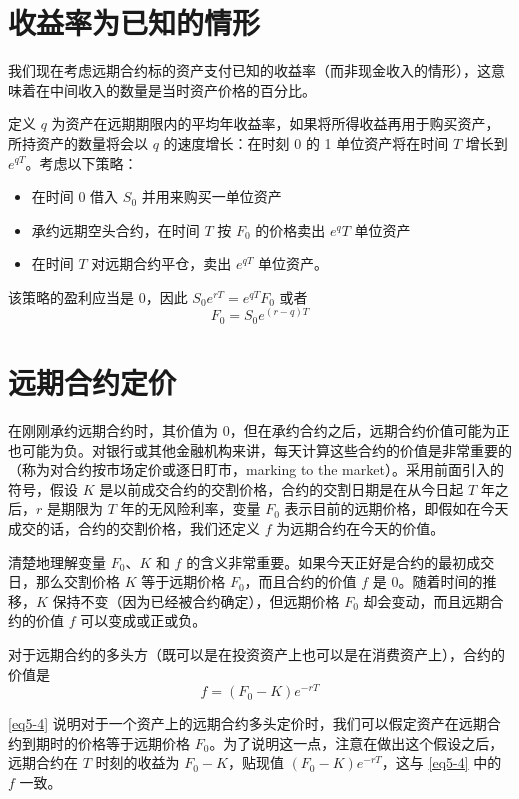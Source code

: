 \section{收益率为已知的情形}
我们现在考虑远期合约标的资产支付已知的收益率（而非现金收入的情形），这意味着在中间收入的数量是当时资产价格的百分比。

定义 $q$ 为资产在远期期限内的平均年收益率，如果将所得收益再用于购买资产，所持资产的数量将会以 $q$ 的速度增长：在时刻 0 的 1 单位资产将在时间 $T$ 增长到 $e^{qT}$。考虑以下策略：
\begin{itemize}
    \item 在时间 0 借入 $S_0$ 并用来购买一单位资产
    \item 承约远期空头合约，在时间 $T$ 按 $F_0$ 的价格卖出 $e^qT$ 单位资产
    \item 在时间 $T$ 对远期合约平仓，卖出 $e^{qT}$ 单位资产。
\end{itemize}
该策略的盈利应当是 0，因此 $S_0e^{rT}=e^{qT}F_0$ 或者
\begin{equation}\label{eq5-3}
    F_0=S_0e^{(r-q)T}
\end{equation}
\section{远期合约定价}
在刚刚承约远期合约时，其价值为 0，但在承约合约之后，远期合约价值可能为正也可能为负。对银行或其他金融机构来讲，每天计算这些合约的价值是非常重要的（称为对合约按市场定价或逐日盯市，marking to the market）。采用前面引入的符号，假设 $K$ 是以前成交合约的交割价格，合约的交割日期是在从今日起 $T$ 年之后，$r$ 是期限为 $T$ 年的无风险利率，变量 $F_0$ 表示目前的远期价格，即假如在今天成交的话，合约的交割价格，我们还定义 $f$ 为远期合约在今天的价值。

清楚地理解变量 $F_0$、$K$ 和 $f$ 的含义非常重要。如果今天正好是合约的最初成交日，那么交割价格 $K$ 等于远期价格 $F_0$，而且合约的价值 $f$ 是 0。随着时间的推移，$K$ 保持不变（因为已经被合约确定），但远期价格 $F_0$ 却会变动，而且远期合约的价值 $f$ 可以变成或正或负。

对于远期合约的多头方（既可以是在投资资产上也可以是在消费资产上），合约的价值是
\begin{equation}\label{eq5-4}
    f=(F_0-K)e^{-rT}
\end{equation}

\autoref{eq5-4} 说明对于一个资产上的远期合约多头定价时，我们可以假定资产在远期合约到期时的价格等于远期价格 $F_0$。为了说明这一点，注意在做出这个假设之后，远期合约在 $T$ 时刻的收益为 $F_0-K$，贴现值 $(F_0-K)e^{-rT}$，这与 \autoref{eq5-4} 中的 $f$ 一致。

